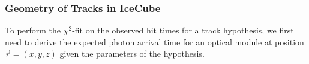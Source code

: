 


\subsubsection{Geometry of Tracks in IceCube}
\label{subsec:geometric-time-derivation}

To perform the $\chi^{2}$-fit on the observed hit times for a track hypothesis, we first need to derive the expected photon arrival time for an optical module at position $\vec{r}=(x,y,z)$ given the parameters of the hypothesis.

